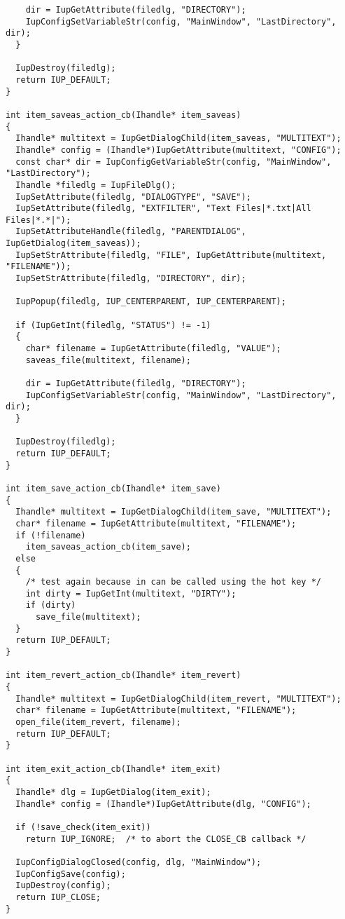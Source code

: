 \documentclass{ctexart}
\begin{document}
\begin{lstlisting}
    dir = IupGetAttribute(filedlg, "DIRECTORY");
    IupConfigSetVariableStr(config, "MainWindow", "LastDirectory", dir);
  }

  IupDestroy(filedlg);
  return IUP_DEFAULT;
}

int item_saveas_action_cb(Ihandle* item_saveas)
{
  Ihandle* multitext = IupGetDialogChild(item_saveas, "MULTITEXT");
  Ihandle* config = (Ihandle*)IupGetAttribute(multitext, "CONFIG");
  const char* dir = IupConfigGetVariableStr(config, "MainWindow", "LastDirectory");
  Ihandle *filedlg = IupFileDlg();
  IupSetAttribute(filedlg, "DIALOGTYPE", "SAVE");
  IupSetAttribute(filedlg, "EXTFILTER", "Text Files|*.txt|All Files|*.*|");
  IupSetAttributeHandle(filedlg, "PARENTDIALOG", IupGetDialog(item_saveas));
  IupSetStrAttribute(filedlg, "FILE", IupGetAttribute(multitext, "FILENAME"));
  IupSetStrAttribute(filedlg, "DIRECTORY", dir);

  IupPopup(filedlg, IUP_CENTERPARENT, IUP_CENTERPARENT);

  if (IupGetInt(filedlg, "STATUS") != -1)
  {
    char* filename = IupGetAttribute(filedlg, "VALUE");
    saveas_file(multitext, filename);

    dir = IupGetAttribute(filedlg, "DIRECTORY");
    IupConfigSetVariableStr(config, "MainWindow", "LastDirectory", dir);
  }

  IupDestroy(filedlg);
  return IUP_DEFAULT;
}

int item_save_action_cb(Ihandle* item_save)
{
  Ihandle* multitext = IupGetDialogChild(item_save, "MULTITEXT");
  char* filename = IupGetAttribute(multitext, "FILENAME");
  if (!filename)
    item_saveas_action_cb(item_save);
  else   
  {
    /* test again because in can be called using the hot key */
    int dirty = IupGetInt(multitext, "DIRTY");
    if (dirty)
      save_file(multitext);
  }
  return IUP_DEFAULT;
}

int item_revert_action_cb(Ihandle* item_revert)
{
  Ihandle* multitext = IupGetDialogChild(item_revert, "MULTITEXT");
  char* filename = IupGetAttribute(multitext, "FILENAME");
  open_file(item_revert, filename);
  return IUP_DEFAULT;
}

int item_exit_action_cb(Ihandle* item_exit)
{
  Ihandle* dlg = IupGetDialog(item_exit);
  Ihandle* config = (Ihandle*)IupGetAttribute(dlg, "CONFIG");

  if (!save_check(item_exit))
    return IUP_IGNORE;  /* to abort the CLOSE_CB callback */

  IupConfigDialogClosed(config, dlg, "MainWindow");
  IupConfigSave(config);
  IupDestroy(config);
  return IUP_CLOSE;
}


\end{lstlisting}
\end{document}

